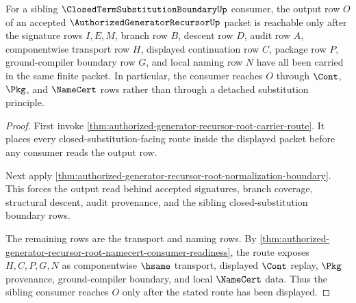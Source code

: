 \begin{theorem}
\label{thm:authorized-generator-recursor-closed-substitution-gate}
For a sibling $\ClosedTermSubstitutionBoundaryUp$ consumer, the output row $O$ of an accepted $\AuthorizedGeneratorRecursorUp$ packet is reachable only after the signature rows $I,E,M$, branch row $B$, descent row $D$, audit row $A$, componentwise transport row $H$, displayed continuation row $C$, package row $P$, ground-compiler boundary row $G$, and local naming row $N$ have all been carried in the same finite packet. In particular, the consumer reaches $O$ through $\Cont$, $\Pkg$, and $\NameCert$ rows rather than through a detached substitution principle.
\end{theorem}
\begin{proof}
First invoke \autoref{thm:authorized-generator-recursor-root-carrier-route}. It places every closed-substitution-facing route inside the displayed packet before any consumer reads the output row.

Next apply \autoref{thm:authorized-generator-recursor-root-normalization-boundary}. This forces the output read behind accepted signatures, branch coverage, structural descent, audit provenance, and the sibling closed-substitution boundary rows.

The remaining rows are the transport and naming rows. By \autoref{thm:authorized-generator-recursor-root-namecert-consumer-readiness}, the route exposes $H,C,P,G,N$ as componentwise $\hsame$ transport, displayed $\Cont$ replay, $\Pkg$ provenance, ground-compiler boundary, and local $\NameCert$ data. Thus the sibling consumer reaches $O$ only after the stated route has been displayed.
\end{proof}

